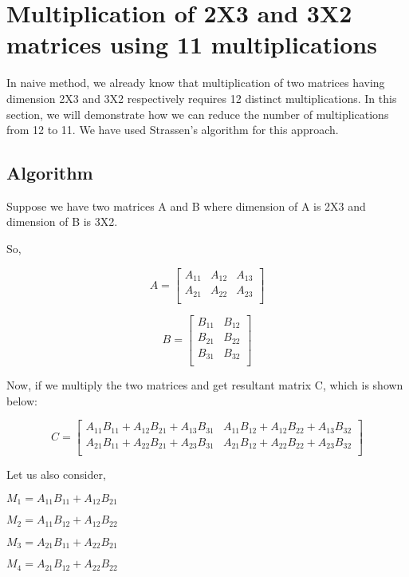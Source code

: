 \chapter{Multiplication of 2X3 and 3X2 matrices using 11 multiplications}\label{intro}

 In naive method, we already know that multiplication of two matrices having dimension 2X3 and 3X2 respectively requires 12 distinct multiplications. In this section, we will demonstrate how we can reduce the number of multiplications from 12 to 11. We have used Strassen's algorithm for this approach. 

\section{Algorithm}
Suppose we have two matrices A and B where dimension of A is 2X3 and dimension of B is 3X2. 

So,

 \[
  A=
  \left[ {\begin{array}{ccc}
   A_{11} & A_{12} & A_{13}\\
   A_{21} & A_{22} & A_{23}\\
  \end{array} } \right]
\]

\[
  B=
  \left[ {\begin{array}{cc}
   B_{11} & B_{12} \\
   B_{21} & B_{22} \\
   B_{31} & B_{32} \\
  \end{array} } \right]
\]

Now, if we multiply the two matrices and get resultant matrix C, which is shown below:

\[
  C=
  \left[ {\begin{array}{cc}
   A_{11}B_{11}+ A_{12}B_{21}+A_{13}B_{31} & A_{11}B_{12}+A_{12}B_{22}+A_{13}B_{32} \\
   A_{21}B_{11}+ A_{22}B_{21}+A_{23}B_{31} & A_{21}B_{12}+A_{22}B_{22}+A_{23}B_{32} \\
  \end{array} } \right]
\]

 Let us also consider, \\
    
    \begin{center}  $M_{1}= A_{11}B_{11}+ A_{12}B_{21}   $ \end{center}
    \begin{center}   $M_{2}=  A_{11}B_{12}+A_{12}B_{22} $ \end{center}
    \begin{center}   $M_{3}= A_{21}B_{11}+ A_{22}B_{21} $ \end{center} 
    \begin{center}   $M_{4}= A_{21}B_{12}+A_{22}B_{22} $ \end{center}

